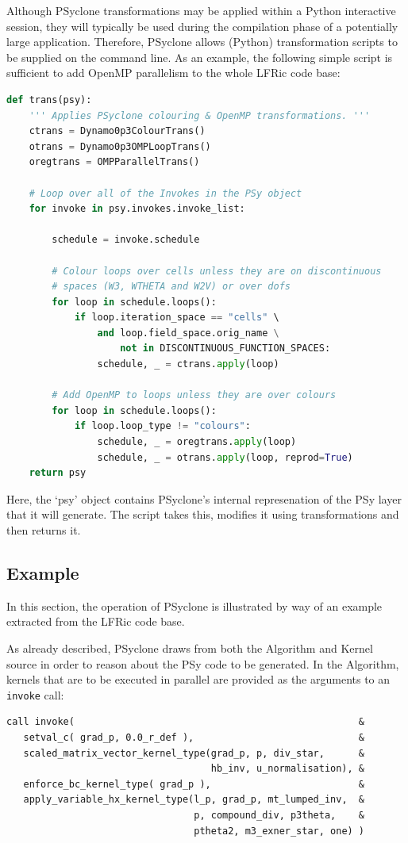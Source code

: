 \documentclass[times]{elsarticle}
\begin{document}
Although PSyclone transformations may be applied within a Python
interactive session, they will typically be used during the
compilation phase of a potentially large application. Therefore,
PSyclone allows (Python) transformation scripts to be supplied
on the command line. As an example, the following simple script is sufficient
to add OpenMP parallelism to the whole LFRic code base:
\begin{lstlisting}[language=python]
def trans(psy):
    ''' Applies PSyclone colouring & OpenMP transformations. '''
    ctrans = Dynamo0p3ColourTrans()
    otrans = Dynamo0p3OMPLoopTrans()
    oregtrans = OMPParallelTrans()

    # Loop over all of the Invokes in the PSy object
    for invoke in psy.invokes.invoke_list:

        schedule = invoke.schedule

        # Colour loops over cells unless they are on discontinuous
        # spaces (W3, WTHETA and W2V) or over dofs
        for loop in schedule.loops():
            if loop.iteration_space == "cells" \
                and loop.field_space.orig_name \
                    not in DISCONTINUOUS_FUNCTION_SPACES:
                schedule, _ = ctrans.apply(loop)

        # Add OpenMP to loops unless they are over colours
        for loop in schedule.loops():
            if loop.loop_type != "colours":
                schedule, _ = oregtrans.apply(loop)
                schedule, _ = otrans.apply(loop, reprod=True)
    return psy
\end{lstlisting}
Here, the `psy' object contains PSyclone's internal represenation of
the PSy layer that it will generate. The script takes this, modifies
it using transformations and then returns it.

\subsection{Example}

In this section, the operation of PSyclone is illustrated by way of
an example extracted from the LFRic code base.

As already described, PSyclone draws from both the Algorithm and
Kernel source in order to reason about the PSy code to be generated.
In the Algorithm, kernels that are to be executed in parallel are
provided as the arguments to an \texttt{invoke} call:

\begin{lstlisting}
call invoke(                                                  &
   setval_c( grad_p, 0.0_r_def ),                             &
   scaled_matrix_vector_kernel_type(grad_p, p, div_star,      &
                                    hb_inv, u_normalisation), &
   enforce_bc_kernel_type( grad_p ),                          &
   apply_variable_hx_kernel_type(l_p, grad_p, mt_lumped_inv,  &
                                 p, compound_div, p3theta,    &
                                 ptheta2, m3_exner_star, one) )
\end{lstlisting}
\end{document}
